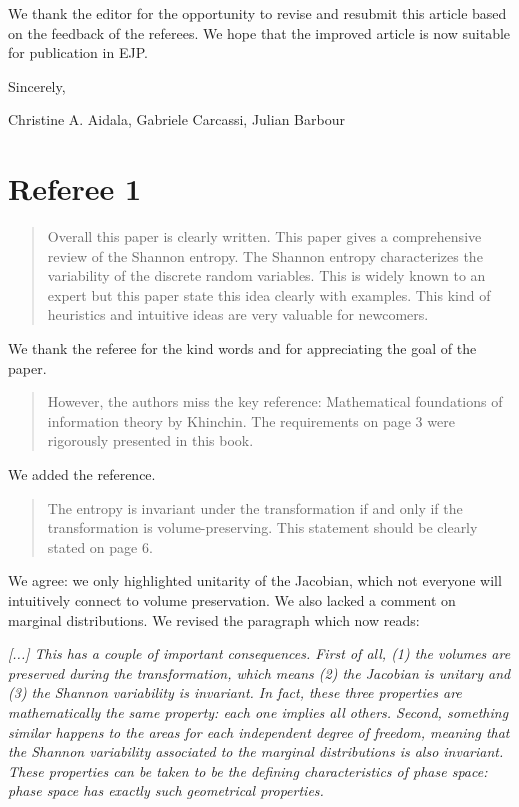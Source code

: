 \documentclass[11pt]{article}
\begin{document}
	
We thank the editor for the opportunity to revise and resubmit this article based on the feedback of the referees. We hope that the improved article is now suitable for publication in EJP.

Sincerely,

Christine A. Aidala, Gabriele Carcassi, Julian Barbour


\section*{Referee 1}

\begin{quote}
Overall this paper is clearly written. This paper gives a comprehensive review of the Shannon entropy. The Shannon entropy characterizes the variability of the discrete random variables. This is widely known to an expert but this paper state this idea clearly with examples. This kind of heuristics and intuitive ideas are very valuable for newcomers.
\end{quote}
We thank the referee for the kind words and for appreciating the goal of the paper.

\begin{quote}
However, the authors miss the key reference: Mathematical foundations of information theory by Khinchin. The requirements on page 3 were rigorously presented in this book. 
\end{quote}
We added the reference.

\begin{quote}
The entropy is invariant under the transformation if and only if the transformation is volume-preserving. This statement should be clearly stated on page 6.
\end{quote}
We agree: we only highlighted unitarity of the Jacobian, which not everyone will intuitively connect to volume preservation. We also lacked a comment on marginal distributions. We revised the paragraph which now reads:

\emph{[...] This has a couple of important consequences. First of all, (1) the volumes are preserved during the transformation, which means (2) the Jacobian is unitary and (3) the Shannon variability is invariant. In fact, these three properties are mathematically the same property: each one implies all others. Second, something similar happens to the areas for each independent degree of freedom, meaning that the Shannon variability associated to the marginal distributions is also invariant. These properties can be taken to be the defining characteristics of phase space: phase space has exactly such geometrical properties.}
\end{document}

